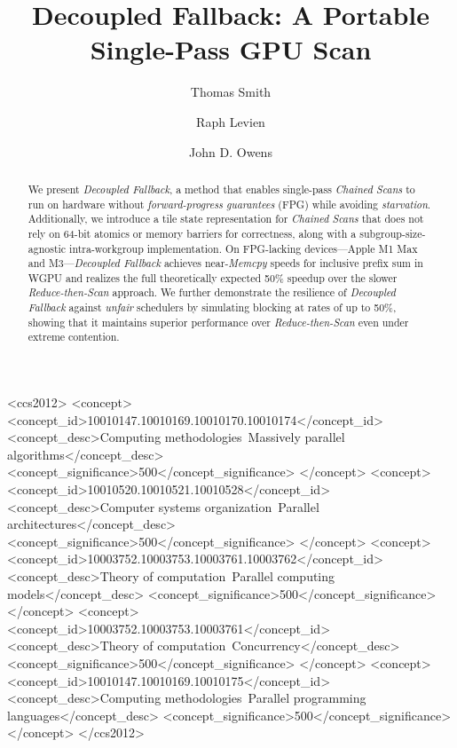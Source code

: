 \documentclass[acmsmall, manuscript, screen, review, anonymous]{acmart}
\begin{document}
\title{Decoupled Fallback: A Portable Single-Pass GPU Scan}

\author{Thomas Smith}

\author{Raph Levien}

\author{John D. Owens}

\renewcommand{\shortauthors}{Smith et al.}

\begin{abstract}
  We present \emph{Decoupled Fallback}, a method that enables single-pass \emph{Chained Scans} to run on hardware without \emph{forward-progress guarantees} (FPG) while avoiding \emph{starvation}. Additionally, we introduce a tile state representation for \emph{Chained Scans} that does not rely on 64-bit atomics or memory barriers for correctness, along with a subgroup-size-agnostic intra-workgroup implementation. On FPG-lacking devices---Apple M1 Max and M3---\emph{Decoupled Fallback} achieves near-\emph{Memcpy} speeds for inclusive prefix sum in WGPU and realizes the full theoretically expected 50\% speedup over the slower \emph{Reduce-then-Scan} approach. We further demonstrate the resilience of \emph{Decoupled Fallback} against \emph{unfair} schedulers by simulating blocking at rates of up to 50\%, showing that it maintains superior performance over \emph{Reduce-then-Scan} even under extreme contention.
\end{abstract}

\begin{CCSXML}
  <ccs2012>
  <concept>
  <concept_id>10010147.10010169.10010170.10010174</concept_id>
  <concept_desc>Computing methodologies~Massively parallel algorithms</concept_desc>
  <concept_significance>500</concept_significance>
  </concept>
  <concept>
  <concept_id>10010520.10010521.10010528</concept_id>
  <concept_desc>Computer systems organization~Parallel architectures</concept_desc>
  <concept_significance>500</concept_significance>
  </concept>
  <concept>
  <concept_id>10003752.10003753.10003761.10003762</concept_id>
  <concept_desc>Theory of computation~Parallel computing models</concept_desc>
  <concept_significance>500</concept_significance>
  </concept>
  <concept>
  <concept_id>10003752.10003753.10003761</concept_id>
  <concept_desc>Theory of computation~Concurrency</concept_desc>
  <concept_significance>500</concept_significance>
  </concept>
  <concept>
  <concept_id>10010147.10010169.10010175</concept_id>
  <concept_desc>Computing methodologies~Parallel programming languages</concept_desc>
  <concept_significance>500</concept_significance>
  </concept>
  </ccs2012>
\end{CCSXML}
\end{document}
